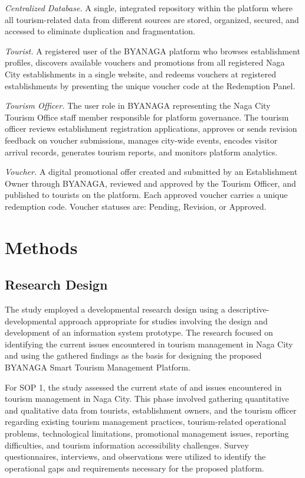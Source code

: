 \documentclass{research}
\begin{document}
\textit{Centralized Database.} A single, integrated repository within the platform where all tourism-related data from different sources are stored, organized, secured, and accessed to eliminate duplication and fragmentation.

\textit{Tourist.} A registered user of the BYANAGA platform who browses establishment profiles, discovers available vouchers and promotions from all registered Naga City establishments in a single website, and redeems vouchers at registered establishments by presenting the unique voucher code at the Redemption Panel.

\textit{Tourism Officer.} The user role in BYANAGA representing the Naga City Tourism Office staff member responsible for platform governance. The tourism officer reviews establishment registration applications, approves or sends revision feedback on voucher submissions, manages city-wide events, encodes visitor arrival records, generates tourism reports, and monitors platform analytics.

\textit{Voucher.} A digital promotional offer created and submitted by an Establishment Owner through BYANAGA, reviewed and approved by the Tourism Officer, and published to tourists on the platform. Each approved voucher carries a unique redemption code. Voucher statuses are: Pending, Revision, or Approved.

\clearpage


\chapter{Methods}

\section{Research Design}
The study employed a developmental research design using a 
descriptive-developmental approach appropriate for studies involving the 
design and development of an information system prototype. The research 
focused on identifying the current issues encountered in tourism management 
in Naga City and using the gathered findings as the basis for designing the 
proposed BYANAGA Smart Tourism Management Platform.

For SOP 1, the study assessed the current state of and issues encountered 
in tourism management in Naga City. This phase involved gathering 
quantitative and qualitative data from tourists, establishment owners, and 
the tourism officer regarding existing tourism management practices, 
tourism-related operational problems, technological limitations, promotional 
management issues, reporting difficulties, and tourism information 
accessibility challenges. Survey questionnaires, interviews, and observations 
were utilized to identify the operational gaps and requirements necessary for 
the proposed platform.
\end{document}
